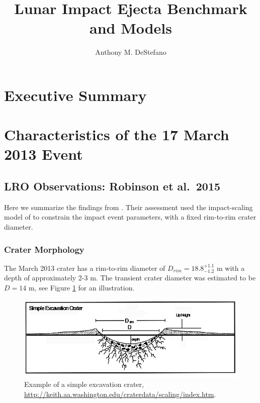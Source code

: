 \documentclass{hitec}
\title{Lunar Impact Ejecta Benchmark and Models}
\author{Anthony M. DeStefano}
\begin{document}
\maketitle
{}

\tableofcontents
\listoffigures
\listoftables
\newpage






\cleardoublepage
{}
\section{Executive Summary}



\section{Characteristics of the 17 March 2013 Event}

\subsection{LRO Observations: Robinson et al.\ 2015}
Here we summarize the findings from \cite{robinson2015new}. Their assessment used the impact-scaling model of \cite{holsapple1993scaling} to constrain the impact event parameters, with a fixed rim-to-rim crater diameter.

\subsubsection{Crater Morphology}
The March 2013 crater has a rim-to-rim diameter of $D_{rim} = 18.8_{-1.2}^{+1.1}$ m with a depth of approximately 2-3 m. The transient crater diameter was estimated to be $D = 14$ m, see Figure \ref{fig:simpleExcavationCrater-Holsapple} for an illustration.
\begin{figure}[h!]
	\centering
	\includegraphics[scale=0.4]{simpleExcavationCrater-Holsapple.jpg}
	\caption{Example of a simple excavation crater, \url{http://keith.aa.washington.edu/craterdata/scaling/index.htm}.}\label{fig:simpleExcavationCrater-Holsapple}
\end{figure}
\end{document}
